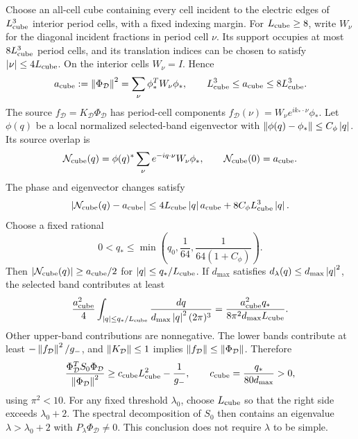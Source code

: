 Choose an all-cell cube containing every cell incident to the electric
edges of \(L_{\rm cube}^3\) interior period cells, with a fixed indexing margin.
For \(L_{\rm cube}\ge8\), write \(W_\nu\) for the diagonal incident fractions in
period cell \(\nu\). Its support occupies at most \(8L_{\rm cube}^3\) period cells,
and its translation indices can be chosen to satisfy \(\left\lvert \nu\right\rvert\le4L_{\rm cube}\).
On the interior cells \(W_\nu=I\). Hence
\begin{equation}
 a_{\rm cube}:=\left\lVert \Phi_{\mathcal D}\right\rVert^2=\sum_\nu\phi_*^TW_\nu\phi_*,
 \qquad L_{\rm cube}^3\le a_{\rm cube}\le8L_{\rm cube}^3.
 \label{d:eq:appendix-cube-mass}
\end{equation}
The source \(f_{\mathcal D}=K_{\mathcal D}\Phi_{\mathcal D}\) has period-cell components
\(f_{\mathcal D}(\nu)=W_\nu e^{ik_*\cdot\nu}\phi_*\). Let \(\phi(q)\) be a local normalized
selected-band eigenvector with
\(\left\lVert \phi(q)-\phi_*\right\rVert\le C_\phi\left\lvert q\right\rvert\). Its source overlap is
\[
 \mathcal N_{\rm cube}(q)
  =\phi(q)^*\sum_\nu e^{-iq\cdot\nu}W_\nu\phi_*,
 \qquad \mathcal N_{\rm cube}(0)=a_{\rm cube}.
\]
The phase and eigenvector changes satisfy
\[
 \left\lvert \mathcal N_{\rm cube}(q)-a_{\rm cube}\right\rvert
 \le4L_{\rm cube}\left\lvert q\right\rvert a_{\rm cube}+8C_\phi L_{\rm cube}^3\left\lvert q\right\rvert.
\]
Choose a fixed rational
\[
 0<q_*\le
 \min\left(q_0,\frac1{64},\frac1{64(1+C_\phi)}\right).
\]
Then \(\left\lvert \mathcal N_{\rm cube}(q)\right\rvert\ge a_{\rm cube}/2\) for
\(\left\lvert q\right\rvert\le q_*/L_{\rm cube}\). If \(d_{\max}\) satisfies
\(d_\lambda(q)\le d_{\max}\left\lvert q\right\rvert^2\), the selected band contributes at least
\[
 \frac{a_{\rm cube}^2}{4}\int_{\left\lvert q\right\rvert\le q_*/L_{\rm cube}}
    \frac{dq}{d_{\max}\left\lvert q\right\rvert^2(2\pi)^3}
 =\frac{a_{\rm cube}^2q_*}{8\pi^2d_{\max}L_{\rm cube}}.
\]
Other upper-band contributions are nonnegative. The lower bands contribute
at least \(-\left\lVert f_{\mathcal D}\right\rVert^2/g_-\), and \(\left\lVert K_{\mathcal D}\right\rVert\le1\) implies
\(\left\lVert f_{\mathcal D}\right\rVert\le\left\lVert \Phi_{\mathcal D}\right\rVert\). Therefore
\begin{equation}
 \frac{\Phi_{\mathcal D}^TS_0\Phi_{\mathcal D}}{\left\lVert \Phi_{\mathcal D}\right\rVert^2}
 \ge c_{\mathrm{cube}}L_{\rm cube}^2-\frac1{g_-},
 \qquad c_{\mathrm{cube}}=\frac{q_*}{80d_{\max}}>0,
 \label{d:eq:appendix-cube-rayleigh}
\end{equation}
using \(\pi^2<10\). For any fixed threshold \(\lambda_0\), choose \(L_{\rm cube}\) so that
the right side exceeds \(\lambda_0+2\). The spectral decomposition of \(S_0\)
then contains an eigenvalue \(\lambda>\lambda_0+2\) with
\(P_\lambda\Phi_{\mathcal D}\ne0\). This conclusion does not require \(\lambda\) to
be simple.

